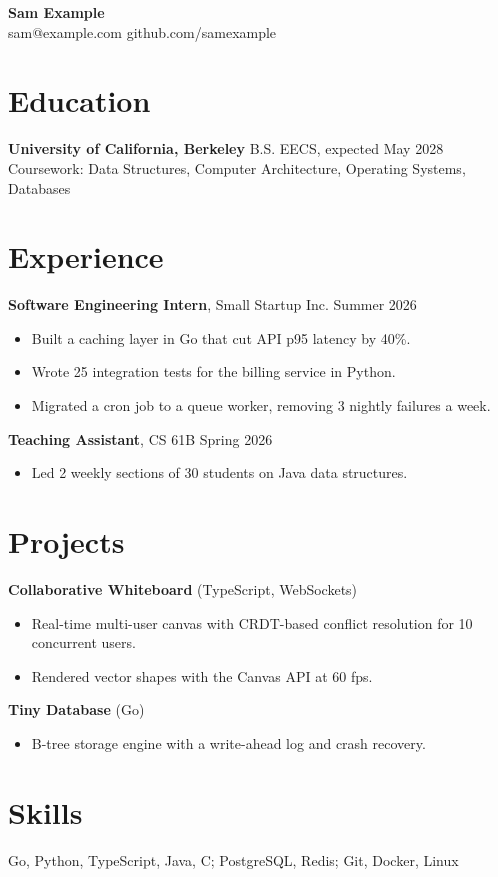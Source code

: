 \documentclass[10pt]{article}
\begin{document}
\begin{center}{\Large\bfseries Sam Example}\\ sam@example.com \textbar{} github.com/samexample\end{center}
\section*{Education}
\textbf{University of California, Berkeley} \hfill B.S. EECS, expected May 2028\\
Coursework: Data Structures, Computer Architecture, Operating Systems, Databases
\section*{Experience}
\textbf{Software Engineering Intern}, Small Startup Inc. \hfill Summer 2026
\begin{itemize}
\item Built a caching layer in Go that cut API p95 latency by 40\%.
\item Wrote 25 integration tests for the billing service in Python.
\item Migrated a cron job to a queue worker, removing 3 nightly failures a week.
\end{itemize}
\textbf{Teaching Assistant}, CS 61B \hfill Spring 2026
\begin{itemize}
\item Led 2 weekly sections of 30 students on Java data structures.
\end{itemize}
\section*{Projects}
\textbf{Collaborative Whiteboard} (TypeScript, WebSockets)
\begin{itemize}
\item Real-time multi-user canvas with CRDT-based conflict resolution for 10 concurrent users.
\item Rendered vector shapes with the Canvas API at 60 fps.
\end{itemize}
\textbf{Tiny Database} (Go)
\begin{itemize}
\item B-tree storage engine with a write-ahead log and crash recovery.
\end{itemize}
\section*{Skills}
Go, Python, TypeScript, Java, C; PostgreSQL, Redis; Git, Docker, Linux
\end{document}
